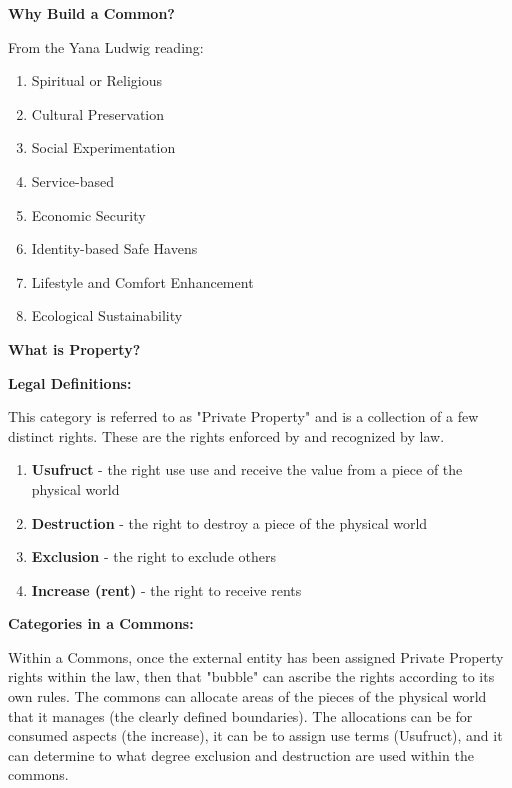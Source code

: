 \documentclass{article}
\begin{document}
\pagebreak
{\centering \huge \textbf{Why Build a Common?}\par}


From the Yana Ludwig reading:

\begin{enumerate}
	\item Spiritual or Religious
	\item 	Cultural Preservation
	\item 	Social Experimentation
	\item 	Service-based
	\item 	Economic Security
	\item 	Identity-based Safe Havens
	\item 	Lifestyle and Comfort Enhancement
	\item 	Ecological Sustainability
\end{enumerate}



\pagebreak
{\centering \huge \textbf{What is Property?}\par}

\vspace{0.2cm}


	
{\centering \large \textbf{Legal Definitions:}\par}

\vspace{0.2cm}

This category is referred to as "Private Property" and is a collection of a few distinct rights. These are the rights enforced by and recognized by law. 

\begin{enumerate}
	
	\item \textbf{Usufruct} - the right use use and receive the value from a piece of the physical world

	\item \textbf{Destruction} - the right to destroy a piece of the physical world

	\item \textbf{Exclusion} -  the right to exclude others
 
	\item \textbf{Increase (rent)} - the right to receive rents
\end{enumerate}
	

{\centering \large \textbf{Categories in a Commons:}\par}
\vspace{0.2cm}
Within a Commons, once the external entity has been assigned Private Property rights within the law, then that "bubble" can ascribe the rights according to its own rules. The commons can allocate areas of the pieces of the physical world that it manages (the clearly defined boundaries). The allocations can be for consumed aspects (the increase), it can be to assign use terms (Usufruct), and it can determine to what degree exclusion and destruction are used within the commons.
\end{document}
